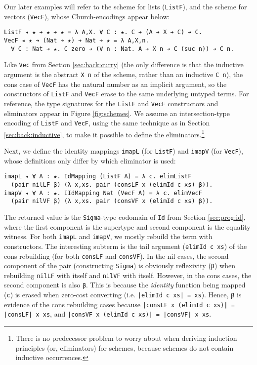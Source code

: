 \documentclass[acmsmall]{acmart}\settopmatter{}
\newcommand{\refsec}[1]{Section \ref{sec:#1}}
\newcommand{\reffig}[1]{Figure \ref{fig:#1}}
\begin{document}
Our later examples will refer to the scheme for lists (\verb;ListF;),
and the scheme for vectors (\verb;VecF;), whose Church-encodings
appear below:
\begin{verbatim}
ListF ◂ ★ ➔ ★ ➔ ★ = λ A,X. ∀ C : ★. C ➔ (A ➔ X ➔ C) ➔ C.
VecF ◂ ★ ➔ (Nat ➔ ★) ➔ Nat ➔ ★ = λ A,X,n. 
  ∀ C : Nat ➔ ★. C zero ➔ (∀ n : Nat. A ➔ X n ➔ C (suc n)) ➔ C n.
\end{verbatim}
Like \verb;Vec; from \refsec{back:curry}
(the only difference is that the inductive argument is the abstract \verb;X n; of
the scheme, rather than an inductive \verb;C n;), the cons case of
\verb;VecF; has the natural number as an implicit argument, so the
constructors of \verb;ListF; and \verb;VecF; erase to the same
underlying untyped terms. For reference, the type signatures for the
\verb;ListF; and \verb;VecF; constructors and eliminators appear in
\reffig{schemes}. We assume an intersection-type encoding of
\verb;ListF; and \verb;VecF;, using the same technique as in
\refsec{back:inductive}, to make it possible to define the
eliminators.\footnote{
  There is no predecessor problem to worry about when deriving
  induction principles (or, eliminators) for schemes, because schemes
  do not contain inductive occurrences.
}

Next, we define the identity mappings \verb;imapL; (for \verb;ListF;)
and \verb;imapV; (for \verb;VecF;), whose definitions only differ by
which eliminator is used:
\begin{verbatim}
imapL ◂ ∀ A : ★. IdMapping (ListF A) = λ c. elimListF
  (pair nilLF β) (λ x,xs. pair (consLF x (elimId c xs) β)).
imapV ◂ ∀ A : ★. IIdMapping Nat (VecF A) = λ c. elimVecF
  (pair nilVF β) (λ x,xs. pair (consVF x (elimId c xs) β)).
\end{verbatim}
The returned value is the \verb;Sigma;-type codomain of \verb;Id; from
\refsec{prog:id}, where the first component is the supertype and
second component is the equality witness. For both \verb;imapL; and
\verb;imapV;, we mostly rebuild the term with constructors. The
interesting subterm is the tail argument (\verb;elimId c xs;) of the
cons rebuilding (for both \verb;consLF; and \verb;consVF;).
In the nil cases, the second component of the pair (constructing
\verb;Sigma;) is obviously reflexivity (\verb;β;) when rebuilding
\verb;nilLF; with itself and \verb;nilVF; with itself. However, in the
cons cases, the second component is also \verb;β;. This is because the
\textit{identity} function being mapped (\verb;c;) is erased when
zero-cost converting (i.e. \verb;|elimId c xs| = xs;).
Hence, \verb;β; is evidence of the
cons rebuilding cases because \verb;|consLF x (elimId c xs)| = |consLF| x xs;,
and \verb;|consVF x (elimId c xs)| = |consVF| x xs;.
\end{document}
